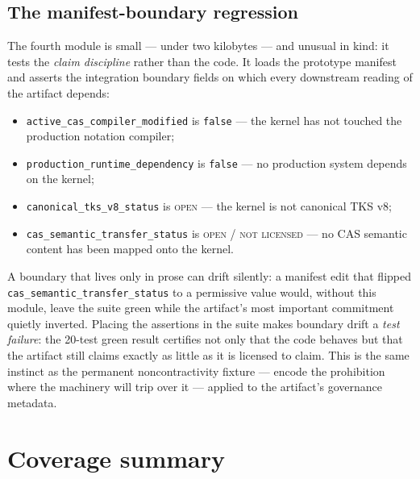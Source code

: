 \subsection{The manifest-boundary regression}\label{ch10:sec:boundary-suite}

The fourth module is small --- under two kilobytes --- and unusual in
kind: it tests the \emph{claim discipline} rather than the code. It loads
the prototype manifest and asserts the integration boundary fields on
which every downstream reading of the artifact depends:

\begin{itemize}
\item \texttt{active\_cas\_compiler\_modified} is \texttt{false} --- the
      kernel has not touched the production notation compiler;
\item \texttt{production\_runtime\_dependency} is \texttt{false} --- no
      production system depends on the kernel;
\item \texttt{canonical\_tks\_v8\_status} is \textsc{open} --- the kernel
      is not canonical TKS v8;
\item \texttt{cas\_semantic\_transfer\_status} is
      \textsc{open / not licensed} --- no CAS semantic content has been
      mapped onto the kernel.
\end{itemize}

\begin{remark}\label{ch10:rem:boundary}
A boundary that lives only in prose can drift silently: a manifest edit
that flipped \texttt{cas\_semantic\_transfer\_status} to a permissive
value would, without this module, leave the suite green while the
artifact's most important commitment quietly inverted. Placing the
assertions in the suite makes boundary drift a \emph{test failure}: the
20-test green result certifies not only that the code behaves but that
the artifact still claims exactly as little as it is licensed to claim.
This is the same instinct as the permanent noncontractivity fixture ---
encode the prohibition where the machinery will trip over it --- applied
to the artifact's governance metadata.
\end{remark}

\section{Coverage summary}\label{ch10:sec:coverage}

